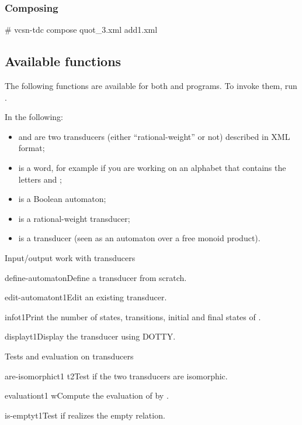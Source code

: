 \subsubsection{Composing}
\begin{shell}
# vcsn-tdc compose quot_3.xml add1.xml
\end{shell}

\subsection{Available functions}
The following functions are available for both 
and  programs.  To invoke them, run
.

\smallskip

In the following:

\begin{itemize}
\item {} and  are two transducers (either ``rational-weight''
  or not) described in \Vauc XML format;
\item {} is a word, for example  if you are working
  on an alphabet that contains the letters  and ;
\item {} is a Boolean automaton;
\item {} is a rational-weight transducer;
\item {} is a transducer (seen as an automaton over a free
  monoid product).
\end{itemize}

\begin{fnsection}{Input/output work with transducers}
\item{define-automaton}{}{Define a transducer from scratch.}
\item{edit-automaton}{t1}{Edit an existing transducer.}
\item{info}{t1}{Print the number of states, transitions, initial and
    final states of .}
\item{display}{t1}{Display the transducer using DOTTY.}  \hline
\end{fnsection}

\begin{fnsection}{Tests and evaluation on transducers}
\item{are-isomorphic}{t1 t2}{Test if the two transducers are
    isomorphic.}
\item{evaluation}{t1 w}{Compute the evaluation of  by
    .}
\item{is-empty}{t1}{Test if  realizes the empty relation.}
  \hline
\end{fnsection}


